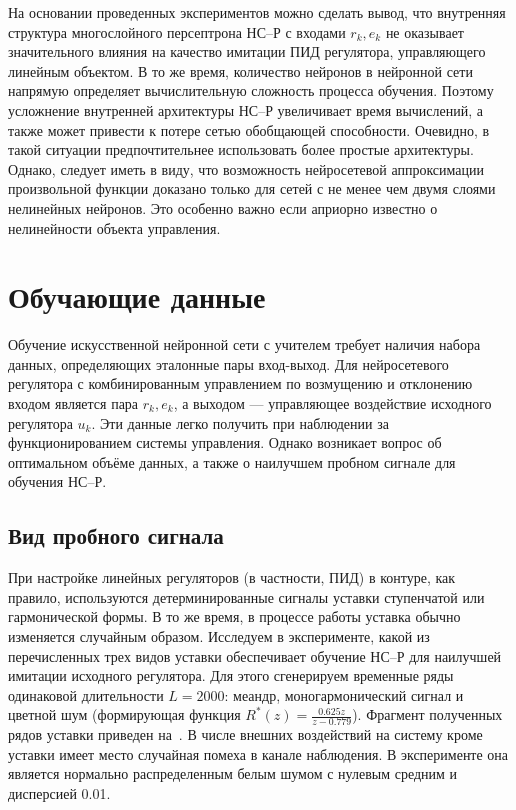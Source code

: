 На основании проведенных экспериментов можно сделать вывод, что
внутренняя структура многослойного персептрона НС--Р с входами
$r_k,e_k$ не оказывает значительного влияния на качество имитации ПИД
регулятора, управляющего линейным объектом.  В то же время, количество
нейронов в нейронной сети напрямую определяет вычислительную сложность
процесса обучения.  Поэтому усложнение внутренней архитектуры НС--Р
увеличивает время вычислений, а также может привести к потере сетью
обобщающей способности.  Очевидно, в такой ситуации предпочтительнее
использовать более простые архитектуры.  Однако, следует иметь в виду,
что возможность нейросетевой аппроксимации произвольной функции
доказано только для сетей с не менее чем двумя слоями нелинейных
нейронов.  Это особенно важно если априорно известно о нелинейности
объекта управления.

\section{Обучающие данные}

Обучение искусственной нейронной сети с учителем требует наличия
набора данных, определяющих эталонные пары вход-выход.  Для
нейросетевого регулятора с комбинированным управлением по возмущению и
отклонению входом является пара $r_k,e_k$, а выходом --- управляющее
воздействие исходного регулятора $u_k$.  Эти данные легко получить при
наблюдении за функционированием системы управления.  Однако возникает
вопрос об оптимальном объёме данных, а также о наилучшем пробном
сигнале для обучения НС--Р.

\subsection{Вид пробного сигнала}

При настройке линейных регуляторов (в частности, ПИД) в контуре, как
правило, используются детерминированные сигналы уставки ступенчатой
или гармонической формы.  В то же время, в процессе работы уставка
обычно изменяется случайным образом.  Исследуем в эксперименте, какой
из перечисленных трех видов уставки обеспечивает обучение НС--Р для
наилучшей имитации исходного регулятора.  Для этого сгенерируем
временные ряды одинаковой длительности $L=2000$: меандр,
моногармонический сигнал и цветной шум (формирующая функция
$R^*(z)=\frac{0.625z}{z-0.779}$).  Фрагмент полученных рядов уставки
приведен на~.  В числе внешних воздействий
на систему кроме уставки имеет место случайная помеха в канале
наблюдения.  В эксперименте она является нормально распределенным
белым шумом с нулевым средним и дисперсией 0.01.

